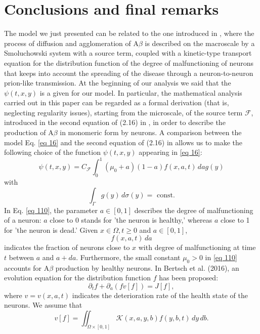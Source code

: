 \section{Conclusions and final remarks}
The model we just presented can be related to the one introduced in \cite{Bertsch}, where the process of diffusion and agglomeration of $\mathrm{A} \beta$ is described on the macroscale by a Smoluchowski system with a source term, coupled with a kinetic-type transport equation for the distribution function of the degree of malfunctioning of neurons that keeps into account the spreading of the disease through a neuron-to-neuron prion-like transmission. At the beginning of our analysis we said that the $\psi(t,x,y)$ is a given for our model. In particular, the mathematical analysis carried out in this paper can be regarded as a formal derivation (that is, neglecting regularity issues), starting from the microscale, of the source term $\mathcal{F}$, introduced in the second equation of (2.16) in \cite{Bertsch}, in order to describe the production of $\mathrm{A} \beta$ in monomeric form by neurons. A comparison between the model Eq. \eqref{eq 16} and the second equation of (2.16) in \cite{Bertsch} allows us to make the following choice of the function $\psi(t, x, y)$ appearing in \eqref{eq 16}:
\begin{equation}
  \psi(t, x, y)=C_{\mathcal{F}} \int_{0}^{1}\left(\mu_{0}+a\right)(1-a) f(x, a, t) \, {d} a g(y)
\label{eq 110}\end{equation}
with
$$
\int_{\Gamma} g(y) \, {d} \sigma(y)=\text { const.}
$$
In Eq. \eqref{eq 110}, the parameter $a \in[0,1]$ describes the degree of malfunctioning of a neuron: $a$ close to 0 stands for 'the neuron is healthy,' whereas $a$ close to 1 for 'the neuron is dead.' Given $x \in \Omega, t \geq 0$ and $a \in[0,1]$,
$$
f(x, a, t) \, {d} a
$$
indicates the fraction of neurons close to $x$ with degree of malfunctioning at time $t$ between $a$ and $a+d a$. Furthermore, the small constant $\mu_{0}>0$ in \eqref{eq 110} accounts for $\mathrm{A} \beta$ production by healthy neurons. In Bertsch et al. (2016), an evolution equation for the distribution function $f$ has been proposed:
\begin{equation}
  \partial_{t} f+\partial_{a}(f v[f])=J[f],
\label{eq 111}\end{equation}
where $v=v(x, a, t)$ indicates the deterioration rate of the health state of the neurons. We assume that
\begin{equation}
  v[f]=\iint_{\Omega \times[0,1]} \mathcal{K}(x, a, y, b) f(y, b, t) \, {d} y \, {d} b .
\label{eq 112}\end{equation}
